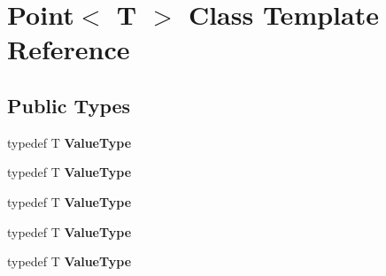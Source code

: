 \hypertarget{class_point}{
\section{Point$<$ T $>$ Class Template Reference}
\label{class_point}
}
\subsection*{Public Types}
\begin{DoxyCompactItemize}
\item 
\hypertarget{class_point_a49288530bfc9322bbabd826d43a6e29a}{
typedef T {\bfseries ValueType}}
\label{class_point_a49288530bfc9322bbabd826d43a6e29a}

\item 
\hypertarget{class_point_a49288530bfc9322bbabd826d43a6e29a}{
typedef T {\bfseries ValueType}}
\label{class_point_a49288530bfc9322bbabd826d43a6e29a}

\item 
\hypertarget{class_point_a49288530bfc9322bbabd826d43a6e29a}{
typedef T {\bfseries ValueType}}
\label{class_point_a49288530bfc9322bbabd826d43a6e29a}

\item 
\hypertarget{class_point_a49288530bfc9322bbabd826d43a6e29a}{
typedef T {\bfseries ValueType}}
\label{class_point_a49288530bfc9322bbabd826d43a6e29a}

\item 
\hypertarget{class_point_a49288530bfc9322bbabd826d43a6e29a}{
typedef T {\bfseries ValueType}}
\label{class_point_a49288530bfc9322bbabd826d43a6e29a}

\end{DoxyCompactItemize}
